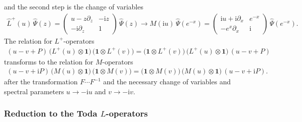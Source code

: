 \documentclass[11pt]{article}
\numberwithin{equation}{section}
\theoremstyle{plain}
\theoremstyle{definition}
\renewcommand{\imath}{\mathrm{i}}
\begin{document}
and the second step is the change of variables 
\begin{align*} 
	\hat{L}^+(u)\,\hat{\Psi}(z)  = \left(\begin{array}{cc}
		u - z\partial_z & -\imath z  \\
		-\imath\partial_z & 1\end{array}\right)\,\hat{\Psi}(z) 
	\longrightarrow  
	M(\imath u)\,\hat{\Psi}(e^{-x}) = \left(\begin{array}{cc}
		\imath u + \imath\partial_x & e^{-x}  \\
		-e^{x}\partial_x & \imath\end{array}\right)\,\hat{\Psi}(e^{-x}).
\end{align*}
The relation for $L^{+}$-operators
\begin{align*}
	\textstyle \left(u-v  + P\right)\, \bigl(L^{+}(u)\otimes \bm{1}\bigr)\, 
	\bigl(\bm{1} \otimes L^{+}(v)\bigr)
	=  
	\bigl(\bm{1} \otimes L^{+}(v)\bigr)\,
	\bigl(L^{+}(u)\otimes \bm{1}\bigr)\, \left(u-v  + P\right)
\end{align*}
transforms to the relation for $M$-operators 
\begin{align*}
	\textstyle \left(u-v  + \imath P\right)\, \bigl(M(u)\otimes \bm{1}\bigr)\, 
	\bigl(\bm{1} \otimes M(v)\bigr)
	=  
	\bigl(\bm{1} \otimes M(v)\bigr)\,
	\bigl(M(u)\otimes \bm{1}\bigr)\, \left(u-v  + \imath P\right).
\end{align*}
after the transformation $F \cdots F^{-1}$ and the necessary
change of variables and spectral parameters $u \to -\imath u$ and $v \to -\imath v$.


\subsubsection{Reduction to the Toda $L$-operators}
\end{document}
